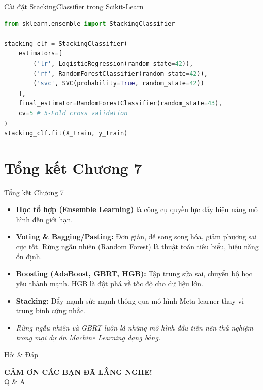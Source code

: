 \documentclass[aspectratio=169]{beamer}
\begin{document}
\begin{frame}[fragile]{Cài đặt StackingClassifier trong Scikit-Learn}
    \begin{lstlisting}[language=Python]
from sklearn.ensemble import StackingClassifier

stacking_clf = StackingClassifier(
    estimators=[
        ('lr', LogisticRegression(random_state=42)),
        ('rf', RandomForestClassifier(random_state=42)),
        ('svc', SVC(probability=True, random_state=42))
    ],
    final_estimator=RandomForestClassifier(random_state=43),
    cv=5 # 5-Fold cross validation
)
stacking_clf.fit(X_train, y_train)
    \end{lstlisting}
\end{frame}

\section{Tổng kết Chương 7}
\begin{frame}{Tổng kết Chương 7}
    \begin{itemize}
        \item \textbf{Học tổ hợp (Ensemble Learning)} là công cụ quyền lực đẩy hiệu năng mô hình đến giới hạn.
        \item \textbf{Voting \& Bagging/Pasting:} Đơn giản, dễ song song hóa, giảm phương sai cực tốt. Rừng ngẫu nhiên (Random Forest) là thuật toán tiêu biểu, hiệu năng ổn định.
        \item \textbf{Boosting (AdaBoost, GBRT, HGB):} Tập trung sửa sai, chuyển bộ học yếu thành mạnh. HGB là đột phá về tốc độ cho dữ liệu lớn.
        \item \textbf{Stacking:} Đẩy mạnh sức mạnh thông qua mô hình Meta-learner thay vì trung bình cứng nhắc.
        \item \textit{Rừng ngẫu nhiên và GBRT luôn là những mô hình đầu tiên nên thử nghiệm trong mọi dự án Machine Learning dạng bảng.}
    \end{itemize}
\end{frame}

\begin{frame}{Hỏi \& Đáp}
    \begin{center}
        \Large{\textbf{CẢM ƠN CÁC BẠN ĐÃ LẮNG NGHE!}}\\
        \vspace{1cm}
        Q \& A
    \end{center}
\end{frame}
\end{document}
